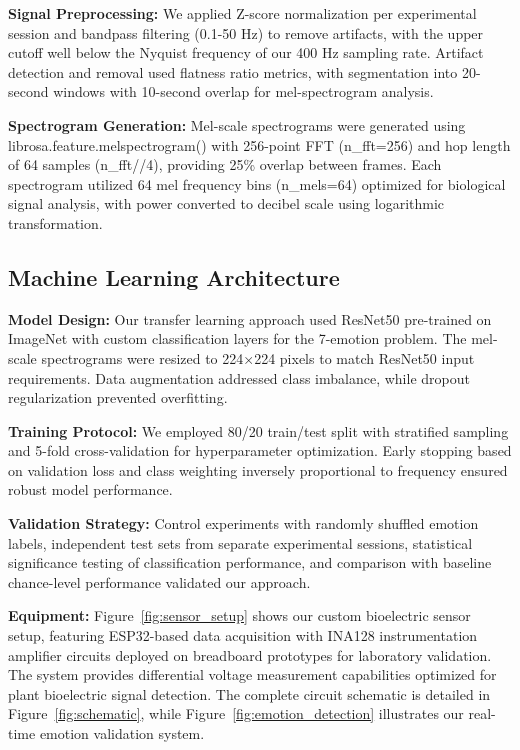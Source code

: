 \documentclass{article}
\begin{document}
\textbf{Signal Preprocessing:} We applied Z-score normalization per experimental session and bandpass filtering (0.1-50 Hz) to remove artifacts, with the upper cutoff well below the Nyquist frequency of our 400 Hz sampling rate. Artifact detection and removal used flatness ratio metrics, with segmentation into 20-second windows with 10-second overlap for mel-spectrogram analysis.

\textbf{Spectrogram Generation:} Mel-scale spectrograms were generated using librosa.feature.melspectrogram() with 256-point FFT (n\_fft=256) and hop length of 64 samples (n\_fft//4), providing 25\% overlap between frames. Each spectrogram utilized 64 mel frequency bins (n\_mels=64) optimized for biological signal analysis, with power converted to decibel scale using logarithmic transformation.

\subsection{Machine Learning Architecture}

\textbf{Model Design:} Our transfer learning approach used ResNet50 pre-trained on ImageNet with custom classification layers for the 7-emotion problem. The mel-scale spectrograms were resized to 224×224 pixels to match ResNet50 input requirements. Data augmentation addressed class imbalance, while dropout regularization prevented overfitting.

\textbf{Training Protocol:} We employed 80/20 train/test split with stratified sampling and 5-fold cross-validation for hyperparameter optimization. Early stopping based on validation loss and class weighting inversely proportional to frequency ensured robust model performance.

\textbf{Validation Strategy:} Control experiments with randomly shuffled emotion labels, independent test sets from separate experimental sessions, statistical significance testing of classification performance, and comparison with baseline chance-level performance validated our approach.

\textbf{Equipment:} Figure~\ref{fig:sensor_setup} shows our custom bioelectric sensor setup, featuring ESP32-based data acquisition with INA128 instrumentation amplifier circuits deployed on breadboard prototypes for laboratory validation. The system provides differential voltage measurement capabilities optimized for plant bioelectric signal detection. The complete circuit schematic is detailed in Figure~\ref{fig:schematic}, while Figure~\ref{fig:emotion_detection} illustrates our real-time emotion validation system.
\end{document}
